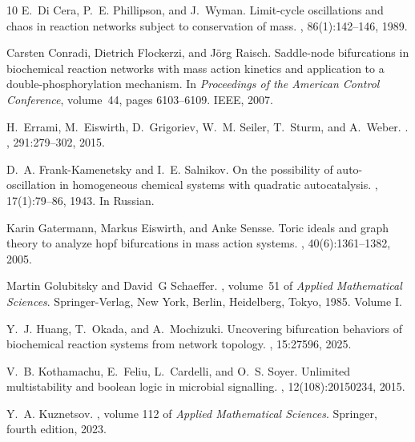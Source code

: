 \documentclass[11pt]{amsart}
\theoremstyle{definition}
\begin{document}
\begin{thebibliography}{10}
E.~Di Cera, P.~E. Phillipson, and J.~Wyman.
\newblock Limit-cycle oscillations and chaos in reaction networks subject to
  conservation of mass.
, 86(1):142--146, 1989.

Carsten Conradi, Dietrich Flockerzi, and J{\"o}rg Raisch.
\newblock Saddle-node bifurcations in biochemical reaction networks with mass
  action kinetics and application to a double-phosphorylation mechanism.
\newblock In {\em Proceedings of the American Control Conference}, volume~44,
  pages 6103--6109. IEEE, 2007.

H.~Errami, M.~Eiswirth, D.~Grigoriev, W.~M. Seiler, T.~Sturm, and A.~Weber.
.
, 291:279--302, 2015.

D.~A. Frank-Kamenetsky and I.~E. Salnikov.
\newblock On the possibility of auto-oscillation in homogeneous chemical
  systems with quadratic autocatalysis.
, 17(1):79--86, 1943.
\newblock In Russian.

Karin Gatermann, Markus Eiswirth, and Anke Sensse.
\newblock Toric ideals and graph theory to analyze hopf bifurcations in mass
  action systems.
, 40(6):1361--1382, 2005.

Martin Golubitsky and David~G Schaeffer.
, volume~51 of
  {\em Applied Mathematical Sciences}.
\newblock Springer-Verlag, New York, Berlin, Heidelberg, Tokyo, 1985.
\newblock Volume I.

Y.~J. Huang, T.~Okada, and A.~Mochizuki.
\newblock Uncovering bifurcation behaviors of biochemical reaction systems from
  network topology.
, 15:27596, 2025.

V.~B. Kothamachu, E.~Feliu, L.~Cardelli, and O.~S. Soyer.
\newblock Unlimited multistability and boolean logic in microbial signalling.
, 12(108):20150234, 2015.

Y.~A. Kuznetsov.
, volume 112 of {\em
  Applied Mathematical Sciences}.
\newblock Springer, fourth edition, 2023.


\end{thebibliography}
\end{document}
